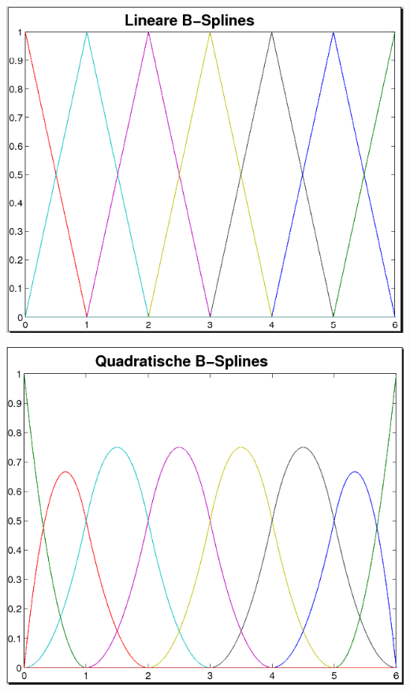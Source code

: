 \begin{image}{}
  \includegraphics[width=\linewidth]{images/linBsplines.png}
\end{image}\label{im6.2.6(1)}
\begin{image}{}
  \includegraphics[width=\linewidth]{images/quadBsplines.png}
\end{image}\label{im6.2.6(2)}
